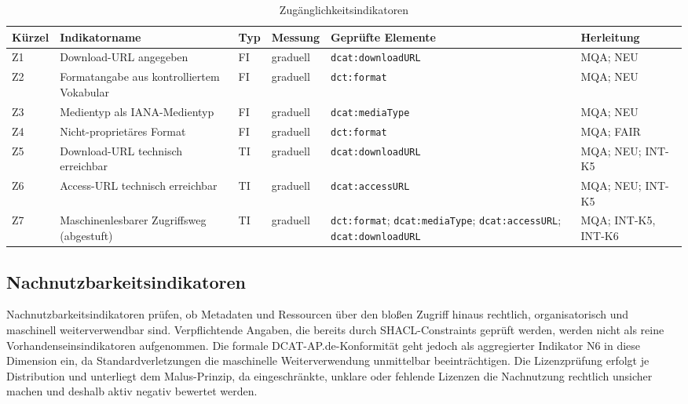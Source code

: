 \begin{table}[H]
\centering
\scriptsize
\renewcommand{\arraystretch}{1.2}
\begin{tabular}{p{} p{} p{} p{} p{} >{\raggedright\arraybackslash}p{}}
    \hline
    \textbf{Kürzel} & \textbf{Indikatorname} & \textbf{Typ} & \textbf{Messung} & \textbf{Geprüfte Elemente} & \textbf{Herleitung} \\
    \hline
    Z1 & Download-URL angegeben & FI & graduell & \texttt{dcat:downloadURL} & MQA; NEU \\
    \hline
    Z2 & Formatangabe aus kontrolliertem Vokabular & FI & graduell & \texttt{dct:format} & MQA; NEU \\
    \hline
    Z3 & Medientyp als IANA-Medientyp & FI & graduell & \texttt{dcat:mediaType} & MQA; NEU \\
    \hline
    Z4 & Nicht-proprietäres Format & FI & graduell & \texttt{dct:format} & MQA; FAIR \\
    \hline
    Z5 & Download-URL technisch erreichbar & TI & graduell & \texttt{dcat:downloadURL} & MQA; NEU; INT-K5 \\
    \hline
    Z6 & Access-URL technisch erreichbar & TI & graduell & \texttt{dcat:accessURL} & MQA; NEU; INT-K5 \\
    \hline
    Z7 & Maschinenlesbarer Zugriffsweg (abgestuft) & TI & graduell & \texttt{dct:format}; \texttt{dcat:mediaType}; \texttt{dcat:accessURL}; \texttt{dcat:downloadURL} & MQA; INT-K5, INT-K6 \\
    \hline
\end{tabular}
\caption{Zugänglichkeitsindikatoren}
\label{tab:zugaenglichkeitsindikatoren}
\end{table}

\subsection{Nachnutzbarkeitsindikatoren}

Nachnutzbarkeitsindikatoren prüfen, ob Metadaten und Ressourcen über den bloßen Zugriff hinaus rechtlich, organisatorisch und maschinell weiterverwendbar sind. Verpflichtende Angaben, die bereits durch SHACL-Constraints geprüft werden, werden nicht als reine Vorhandenseinsindikatoren aufgenommen. Die formale DCAT-AP.de-Konformität geht jedoch als aggregierter Indikator N6 in diese Dimension ein, da Standardverletzungen die maschinelle Weiterverwendung unmittelbar beeinträchtigen. Die Lizenzprüfung erfolgt je Distribution und unterliegt dem Malus-Prinzip, da eingeschränkte, unklare oder fehlende Lizenzen die Nachnutzung rechtlich unsicher machen und deshalb aktiv negativ bewertet werden.

